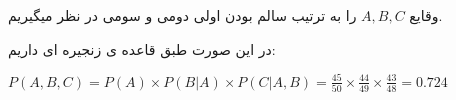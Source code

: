 وقایع 
$A, B, C$ 
را به ترتیب سالم بودن اولی دومی و سومی در نظر میگیریم.

در این صورت طبق قاعده ی زنجیره ای داریم:

$P(A, B, C) = P(A) \times P(B|A) \times P(C|A, B) = \frac{45}{50} \times \frac{44}{49} \times \frac{43}{48} = 0.724$